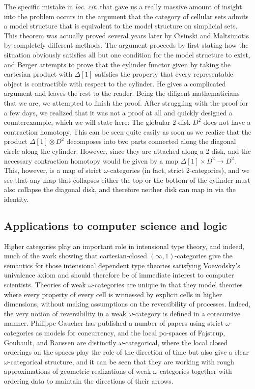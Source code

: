 \documentclass[a4paper,9pt]{amsart}
\theoremstyle{plain}   %
\theoremstyle{remark}
\theoremstyle{plain}
\begin{document}
The specific mistake in \emph{loc. cit.} that gave us a really massive amount of insight into the problem occurs in the argument that the category of cellular sets admits a model structure that is equivalent to the model structure on simplicial sets.  This theorem was actually proved several years later by Cisinski and Maltsiniotis by completely different methods.  The argument proceeds by first stating how the situation obviously satisfies all but one condition for the model structure to exist, and Berger attempts to prove that the cylinder functor given by taking the cartesian product with \(\Delta[1]\) satisfies the property that every representable object is contractible with respect to the cylinder.  He gives a complicated argument and leaves the rest to the reader.  Being the diligent mathematicians that we are, we attempted to finish the proof.  After struggling with the proof for a few days, we realized that it was not a proof at all and quickly designed a counterexample, which we will state here: The globular \(2\)-disk \(D^2\) does not have a contraction homotopy.  This can be seen quite easily as soon as we realize that the product \(\Delta[1]\otimes D^2\) decomposes into two parts connected along the diagonal circle along the cylinder.  However, since they are attached along a \(2\)-disk, and the necessary contraction homotopy would be given by a map \(\Delta[1]\times D^2\to D^2\).  This, however, is a map of strict \(\omega\)-categories (in fact, strict \(2\)-categories), and we see that any map that collapses either the top or the bottom of the cylinder must also collapse the diagonal disk, and therefore neither disk can map in via the identity.  

\subsection{Applications to computer science and logic}
Higher categories play an important role in intensional type theory, and indeed, much of the work showing that cartesian-closed \((\infty,1)\)-categories give the semantics for those intensional dependent type theories satisfying Voevodsky's univalence axiom and should therefore be of immediate interest to computer scientists.  Theories of weak \(\omega\)-categories are unique in that they model theories where every property of every cell is witnessed by explicit cells in higher dimensions, without making assumptions on the reversibility of processes.  Indeed, the very notion of reversibility in a weak \(\omega\)-category is defined in a corecursive manner. Philippe Gaucher has published a number of papers using strict \(\omega\)-categories as models for concurrency, and the local po-spaces of Fajstrup, Goubault, and Raussen are distinctly \(\omega\)-categorical, where the local closed orderings on the spaces play the role of the direction of time but also give a clear \(\omega\)-categorical structure, and it can be seen that they are working with rough approximations of geometric realizations of weak \(\omega\)-categories together with ordering data to maintain the directions of their arrows.  
\end{document}
